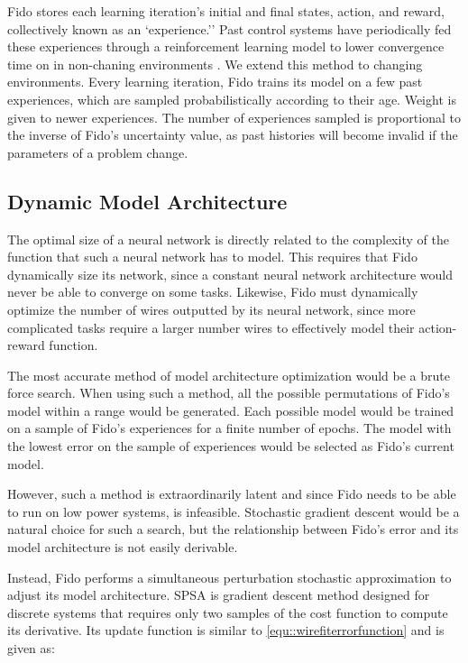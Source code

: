 Fido stores each learning iteration's initial and final states, action, and reward, collectively known as an `experience.'' Past control systems have periodically fed these experiences through a reinforcement learning model to lower convergence time on in non-chaning environments \cite{adam}. We extend this method to changing environments. Every learning iteration, Fido trains its model on a few past experiences, which are sampled probabilistically according to their age. Weight is given to newer experiences. The number of experiences sampled is proportional to the inverse of Fido's uncertainty value, as past histories will become invalid if the parameters of a problem change.

\subsection{Dynamic Model Architecture}

The optimal size of a neural network is directly related to the complexity of the function that such a neural network has to model. This requires that Fido dynamically size its network, since a constant neural network architecture would never be able to converge on some tasks. Likewise, Fido must dynamically optimize the number of wires outputted by its neural network, since more complicated tasks require a larger number wires to effectively model their action-reward function.

The most accurate method of model architecture optimization would be a brute force search. When using such a method, all the possible permutations of Fido's model within a range would be generated. Each possible model would be trained on a sample of Fido's experiences for a finite number of epochs. The model with the lowest error on the sample of experiences would be selected as Fido's current model.

However, such a method is extraordinarily latent and since Fido needs to be able to run on low power systems, is infeasible. Stochastic gradient descent would be a natural choice for such a search, but the relationship between Fido's error and its model architecture is not easily derivable.

Instead, Fido performs a simultaneous perturbation stochastic approximation \cite{spall} to adjust its model architecture. SPSA is gradient descent method designed for discrete systems that requires only two samples of the cost function to compute its derivative. Its update function is similar to \ref{equ::wirefiterrorfunction} and is given as:

